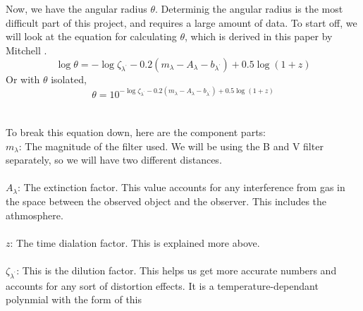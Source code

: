 \\
\\
\\
\\
\\
\\
\\
\\
\\
\\
\\
\\
\\
\\
\\
\\
\\
\\
\\
Now, we have the angular radius $\theta$. Determinig the angular radius is the most difficult part of this project,
and requires a large amount of data. To start off, we will look at the equation for calculating $\theta$, which is derived in
this paper by Mitchell \cite{mitchell_locating_2023}.
\begin{equation}
    \log{\theta} = -\log{\zeta_{\lambda^{\textrm{'}}}}-0.2(m_\lambda-A_\lambda-b_{\lambda^{\textrm{'}}})+0.5\log{(1+z)}
\end{equation}
Or with $\theta$ isolated,
\begin{equation}
    \theta = 10^{-\log{\zeta_{\lambda^{\textrm{'}}}}-0.2(m_\lambda-A_\lambda-b_{\lambda^{\textrm{'}}})+0.5\log{(1+z)}}
\end{equation}
\\
\\
To break this equation down, here are the component parts:
\\
$m_\lambda$: The magnitude of the filter used. We will be using the B and V filter 
separately, so we will have two different distances.
\\
\\
$A_\lambda$: The extinction factor. This value accounts for any interference from gas in the space between the observed
object and the observer. This includes the athmosphere.
\\
\\
$z$: The time dialation factor. This is explained more above.
\\
\\
$\zeta_{\lambda^{\textrm{'}}}$: This is the dilution factor. This helps us get more accurate numbers and 
accounts for any sort of distortion effects. It is a temperature-dependant polynmial with the form of this 
